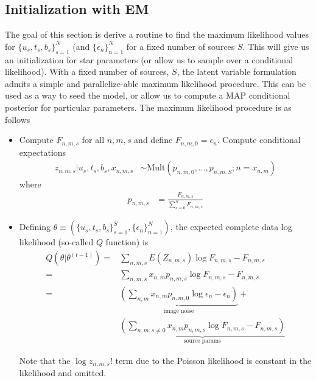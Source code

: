 \documentclass[11pt]{article}
\begin{document}
\subsection{Initialization with EM}
The goal of this section is derive a routine to find the maximum likelihood values for $\{ u_s, t_s, b_s \}_{s=1}^N$ (and $\{ \epsilon_n \}_{n=1}^N$ for a fixed number of sources $S$.  This will give us an initialization for star parameters (or allow us to sample over a conditional likelihood).  With a fixed number of sources, $S$, the latent variable formulation admits a simple and parallelize-able maximum likelihood procedure.  This can be used as a way to seed the model, or allow us to compute a MAP conditional posterior for particular parameters.  The maximum likelihood procedure is as follows
\begin{itemize}
\item Compute $F_{n,m,s}$ for all $n,m,s$ and define $F_{n,m,0} = \epsilon_n$.  Compute conditional expectations  
\begin{align}
  z_{n,m,s} | u_s, t_s, b_s, x_{n,m,s}
    &\sim \textrm{Mult}(p_{n,m,0}, \dots, p_{n,m,S}; n = x_{n,m})
\end{align}
where 
\begin{align}
  p_{n,m,s} &= \frac{F_{n,m,s}}{\sum_{s=0}^S F_{n,m,s}}
\end{align}

\item Defining $\theta \equiv (\{u_s, t_s, b_s\}_{s=1}^S, \{ \epsilon_n \}_{n=1}^N) $, the expected complete data log likelihood (so-called $Q$ function) is
\begin{align}
  Q(\theta | \theta^{(t-1)})
    =& \sum_{n,m,s} E(Z_{n,m,s}) \log F_{n,m,s} - F_{n,m,s} \\
    =& \sum_{n,m,s} x_{n,m} p_{n,m,s} \log F_{n,m,s} - F_{n,m,s} \\
    =& \underbrace{\left( \sum_{n,m} x_{n,m} p_{n,m,0} \log \epsilon_n - \epsilon_n \right)}_{\text{image noise}} + \\
     & \underbrace{\left(\sum_{n,m,s\neq 0} x_{n,m} p_{n,m,s} \log F_{n,m,s} - F_{n,m,s}\right)}_{\text{source params}}
\end{align}

Note that the $\log z_{n,m,s}!$ term due to the Poisson likelihood is constant in the likelihood and omitted. 


\end{itemize}
\end{document}
